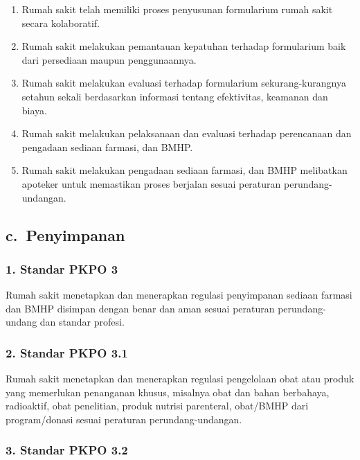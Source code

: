 \documentclass[
]{book}
\providecommand{\tightlist}{%
  \setlength{\itemsep}{0pt}\setlength{\parskip}{0pt}}
\begin{document}
\begin{enumerate}
\def\labelenumi{\alph{enumi}.}
\tightlist
\item
  Rumah sakit telah memiliki proses penyusunan formularium rumah sakit secara kolaboratif.
\item
  Rumah sakit melakukan pemantauan kepatuhan terhadap formularium baik dari persediaan maupun penggunaannya.
\item
  Rumah sakit melakukan evaluasi terhadap formularium sekurang-kurangnya setahun sekali berdasarkan informasi tentang efektivitas, keamanan dan biaya.
\item
  Rumah sakit melakukan pelaksanaan dan evaluasi terhadap perencanaan dan pengadaan sediaan farmasi, dan BMHP.
\item
  Rumah sakit melakukan pengadaan sediaan farmasi, dan BMHP melibatkan apoteker untuk memastikan proses berjalan sesuai peraturan perundang- undangan.
\end{enumerate}

\hypertarget{c.-penyimpanan}{%
\subsection*{c.~Penyimpanan}\label{c.-penyimpanan}}

\hypertarget{standar-pkpo-3}{%
\subsubsection*{1. Standar PKPO 3}\label{standar-pkpo-3}}

Rumah sakit menetapkan dan menerapkan regulasi penyimpanan sediaan farmasi dan BMHP disimpan dengan benar dan aman sesuai peraturan perundang-undang dan standar profesi.

\hypertarget{standar-pkpo-3.1}{%
\subsubsection*{2. Standar PKPO 3.1}\label{standar-pkpo-3.1}}

Rumah sakit menetapkan dan menerapkan regulasi pengelolaan obat atau produk yang memerlukan penanganan khusus, misalnya obat dan bahan berbahaya, radioaktif, obat penelitian, produk nutrisi parenteral, obat/BMHP dari program/donasi sesuai peraturan perundang-undangan.

\hypertarget{standar-pkpo-3.2}{%
\subsubsection*{3. Standar PKPO 3.2}\label{standar-pkpo-3.2}}
\end{document}
